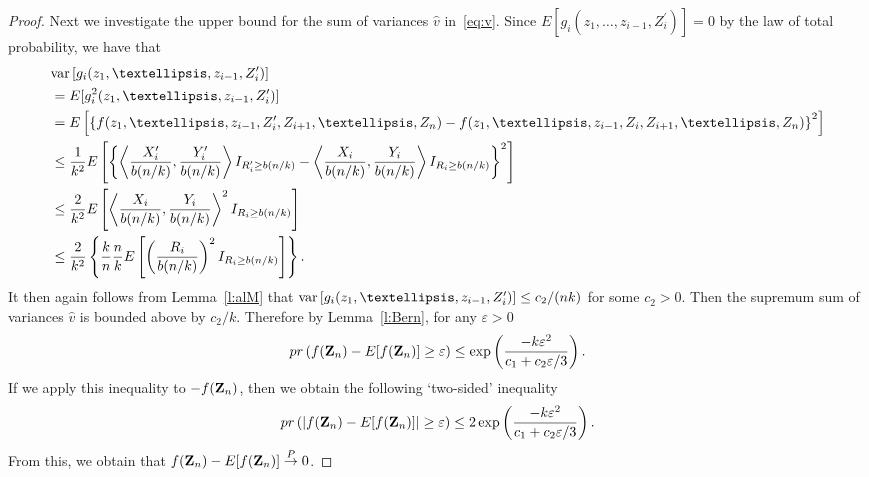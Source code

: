 \documentclass[10pt,a4paper]{amsart}
\def\convP{\stackrel{\mbox{$\scriptstyle P$}}{\rightarrow}}
\newcommand \eg{\varepsilon}
\newcommand\bZ{{\bf Z}}
\newcommand\lbr{\left \{}
\newcommand\lb{\left [}
\newcommand\lip{\left \langle}
\newcommand\lp{\left (}
\newcommand\rbr{\right \}}
\newcommand\rb{\right ]}
\newcommand\rip{\right \rangle}
\newcommand\rp{\right )}
\newcommand\var{\hbox{\rm var}}
\begin{document}
\begin{proof}
Next we investigate the upper bound for the sum of variances $\hat{v}$ in~\eqref{eq:v}. Since $E[g_i(z_1, \ldots, z_{i-1}, Z_i^{\prime})]=0$ by the law of total probability, we have that
\begin{align*}
&\var\lb g_i(z_1, \ldots, z_{i-1}, Z_i^{\prime})\rb \\
&= E [g_i^2(z_1, \ldots, z_{i-1}, Z_i^{\prime})]\\
&= E \lb \lbr  f(z_1, \ldots, z_{i-1},Z_i^{\prime}, Z_{i+1}, \ldots, Z_n)-f(z_1, \ldots, z_{i-1},Z_i, Z_{i+1}, \ldots, Z_n) \rbr^2 \rb \\
&\le \frac{1}{k^2} E\lb \lbr  \lip \frac{X_i^{\prime}}{b(n/k)}, \frac{Y_i^{\prime}}{b(n/k)} \rip I_{R_i^{\prime} \ge b(n/k) } - \lip \frac{X_i}{b(n/k)}, \frac{Y_i}{b(n/k)} \rip I_{R_i \ge b(n/k) }       \rbr^2 \rb \\
&\le \frac{2}{k^2} E \lb \lip \frac{X_i}{b(n/k)}, \frac{Y_i}{b(n/k)} \rip^2 I_{R_i \ge b(n/k) }   \rb \\
&\le \frac{2}{k^2} \lbr  \frac{k}{n} \frac{n}{k} E \lb  \lp \frac{R_i}{b(n/k)} \rp^2  I_{R_i \ge b(n/k) }  \rb \rbr.
\end{align*}
It then again follows from Lemma~\ref{l:alM} that $\var\lb g_i(z_1, \ldots, z_{i-1}, Z_i^{\prime})\rb  \le c_2/(nk)$ for some $c_2>0$. Then the supremum sum of variances $\hat{v}$ is bounded above by $c_2/k$. Therefore by Lemma~\ref{l:Bern}, for any $\eg>0$
\[
{\rm pr} \lp f(\bZ_n) - E[f(\bZ_n)]  \ge \eg \rp \le \exp \lp \frac{-k\eg^2}{c_1+c_2\eg/3} \rp.
\]
If we apply this inequality to $-f(\bZ_n)$, then we obtain the following `two-sided' inequality
\[
{\rm pr} \lp |f(\bZ_n) - E[f(\bZ_n)]|  \ge \eg \rp \le 2\exp \lp \frac{-k\eg^2}{c_1+c_2\eg/3} \rp.
\]
From this, we obtain that  $f(\bZ_n) - E[f(\bZ_n)] \convP 0$.


\end{proof}
\end{document}
